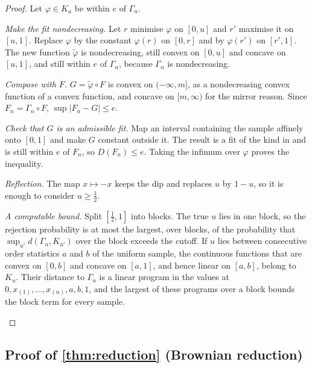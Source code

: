\begin{proof}
Let $\varphi\in K_u$ be within $e$ of $\Gamma_n$.
\begin{steps}
\item \emph{Make the fit nondecreasing.} Let $r$ minimise $\varphi$ on $[0,u]$ and $r'$ maximise it on $[u,1]$. Replace $\varphi$ by the constant $\varphi(r)$ on $[0,r]$ and by $\varphi(r')$ on $[r',1]$. The new function $\tilde\varphi$ is nondecreasing, still convex on $[0,u]$ and concave on $[u,1]$, and still within $e$ of $\Gamma_n$, because $\Gamma_n$ is nondecreasing.
\item \emph{Compose with $F$.} $G=\tilde\varphi\circ F$ is convex on $(-\infty,m]$, as a nondecreasing convex function of a convex function, and concave on $[m,\infty)$ for the mirror reason. Since $F_n=\Gamma_n\circ F$, $\sup|F_n-G|\le e$.
\item \emph{Check that $G$ is an admissible fit.} Map an interval containing the sample affinely onto $[0,1]$ and make $G$ constant outside it. The result is a fit of the kind in \cite[Theorem~1]{HH85} and is still within $e$ of $F_n$, so $D(F_n)\le e$. Taking the infimum over $\varphi$ proves the inequality.
\item \emph{Reflection.} The map $x\mapsto-x$ keeps the dip and replaces $u$ by $1-u$, so it is enough to consider $u\ge\frac12$.
\item \emph{A computable bound.} Split $[\frac12,1]$ into blocks. The true $u$ lies in one block, so the rejection probability is at most the largest, over blocks, of the probability that $\sup_{u'}d(\Gamma_n,K_{u'})$ over the block exceeds the cutoff. If $u$ lies between consecutive order statistics $a$ and $b$ of the uniform sample, the continuous functions that are convex on $[0,b]$ and concave on $[a,1]$, and hence linear on $[a,b]$, belong to $K_u$. Their distance to $\Gamma_n$ is a linear program in the values at $0,x_{(1)},\dots,x_{(n)},a,b,1$, and the largest of these programs over a block bounds the block term for every sample.\qedhere
\end{steps}
\end{proof}

\subsection{Proof of \cref{thm:reduction} (Brownian reduction)}


